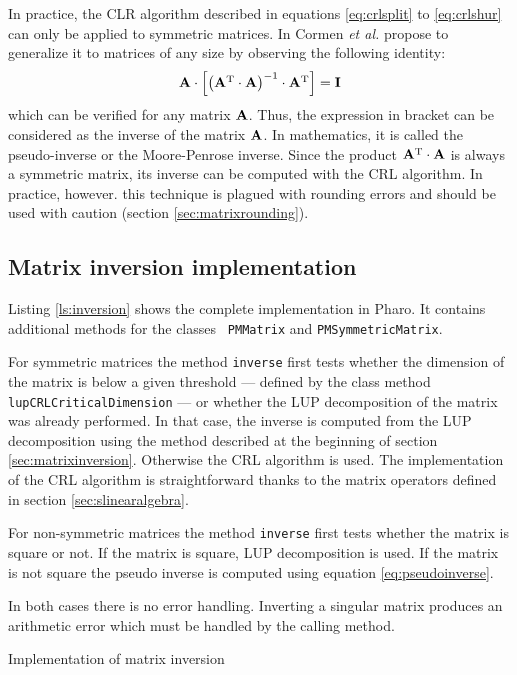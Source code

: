 \documentclass[twoside]{book}
\begin{document}
In practice, the CLR algorithm described in equations
\ref{eq:crlsplit} to \ref{eq:crlshur} can only be applied to
symmetric matrices. In \cite{CorLeiRiv} Cormen {\it et al.}
propose to generalize it to matrices of any size by observing the
following identity:
\begin{equation}
\label{eq:pseudoinverse}
  {\bf A}\cdot\left[\left({\bf A}^{\mathop{\rm T}}\cdot{\bf A}\right)^{-1}\cdot{\bf A}^{\mathop{\rm T}}\right]={\bf I}
\end{equation}
which can be verified for any matrix ${\bf A}$. Thus, the
expression in bracket can be considered as the inverse of the
matrix ${\bf A}$. In mathematics, it is called the pseudo-inverse
or the Moore-Penrose inverse. Since the product
${\bf A}^{\mathop{\rm T}}\cdot{\bf A}$ is always a symmetric matrix, its
inverse can be computed with the CRL algorithm. In practice,
however. this technique is plagued with rounding errors and should
be used with caution (\cf section \ref{sec:matrixrounding}).

\subsection{Matrix inversion implementation}
Listing \ref{ls:inversion} shows the complete implementation in
Pharo. It contains additional methods for the classes {\tt
PMMatrix} and {\tt PMSymmetricMatrix}.

For symmetric matrices the method {\tt inverse} first tests
whether the dimension of the matrix is below a given threshold ---
defined by the class method {\tt lupCRLCriticalDimension} --- or
whether the LUP decomposition of the matrix was already performed.
In that case, the inverse is computed from the LUP decomposition
using the method described at the beginning of section
\ref{sec:matrixinversion}. Otherwise the CRL algorithm is used.
The implementation of the CRL algorithm is straightforward thanks
to the matrix operators defined in section
\ref{sec:slinearalgebra}.

For non-symmetric matrices the method {\tt inverse} first tests
whether the matrix is square or not. If the matrix is square, LUP
decomposition is used. If the matrix is not square the pseudo
inverse is computed using equation \ref{eq:pseudoinverse}.

In both cases there is no error handling. Inverting a singular
matrix produces an arithmetic error which must be handled by the
calling method.

\begin{listing}  Implementation of matrix inversion \label{ls:inversion}


\end{listing}
\end{document}
